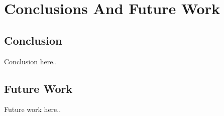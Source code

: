 
\chapter{Conclusions And Future Work}
\label{Chapter 5}

\section{Conclusion}
Conclusion here..

\section{Future Work}
Future work here..

